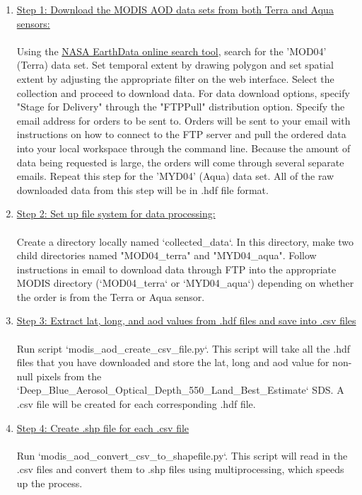 \begin{enumerate}
\item \underline{Step 1: Download the MODIS AOD data sets from both Terra and Aqua sensors:}\\\\
Using the \href{https://search.earthdata.nasa.gov/search?q=MOD04&ok=MOD04}{NASA EarthData online search tool}, search for the 'MOD04' (Terra) data set. Set temporal extent by drawing polygon and set spatial extent by adjusting the appropriate filter on the web interface. Select the collection and proceed to download data. For data download options, specify "Stage for Delivery" through the "FTPPull" distribution option. Specify the email address for orders to be sent to. Orders will be sent to your email with instructions on how to connect to the FTP server and pull the ordered data into your local workspace through the command line. Because the amount of data being requested is large, the orders will come through several separate emails. Repeat this step for the 'MYD04' (Aqua) data set. All of the raw downloaded data from this step will be in .hdf file format.
\item  \underline{Step 2: Set up file system for data processing:}\\\\ 
Create a directory locally named `collected\_data`. In this directory, make two child directories named "MOD04\_terra" and "MYD04\_aqua". Follow instructions in email to download data through FTP into the appropriate MODIS directory (`MOD04\_terra` or `MYD04\_aqua`) depending on whether the order is from the Terra or Aqua sensor.
\item \underline{Step 3: Extract lat, long, and aod values from .hdf files and save into .csv files}\\\\
Run script `modis\_aod\_create\_csv\_file.py`. This script will take all the .hdf files that you have downloaded and store the lat, long and aod value for non-null pixels from the `Deep\_Blue\_Aerosol\_Optical\_Depth\_550\_Land\_Best\_Estimate` SDS. A .csv file will be created for each corresponding .hdf file.
\item \underline{Step 4: Create .shp file for each .csv file}\\\\
Run `modis\_aod\_convert\_csv\_to\_shapefile.py`. This script will read in the .csv files and convert them to .shp files using multiprocessing, which speeds up the process.


\end{enumerate}
